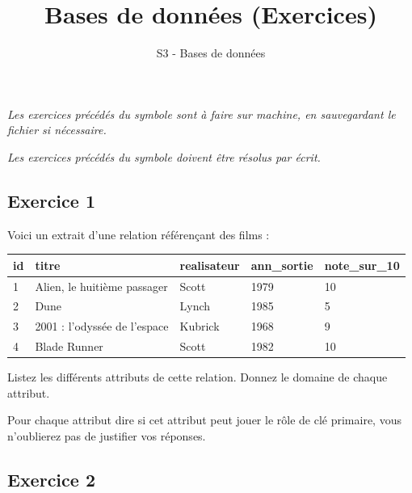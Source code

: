 \documentclass[
  a4paper,
  DIV=11,
  numbers=noendperiod]{scrartcl}
\title{Bases de données (Exercices)}
\subtitle{S3 - Bases de données}
\author{}
\date{}
\begin{document}
\maketitle
{}  \chead{} \cfoot{}   \renewcommand{\headrulewidth}{0pt} \renewcommand{\footrulewidth}{0pt} \thispagestyle{fancy} \vspace{-3cm}

\ifdefined\Shaded\renewenvironment{Shaded}{\begin{tcolorbox}[enhanced, interior hidden, borderline west={3pt}{0pt}{shadecolor}, sharp corners, frame hidden, breakable, boxrule=0pt]}{\end{tcolorbox}}\fi

\emph{Les exercices précédés du symbole  sont à faire
sur machine, en sauvegardant le fichier si nécessaire.}

\emph{Les exercices précédés du symbole  doivent être
résolus par écrit.}

\hypertarget{fa-solid-pencil-alt-exercice-1}{%
\subsection{\texorpdfstring{ Exercice
1}{ Exercice 1}}\label{fa-solid-pencil-alt-exercice-1}}

Voici un extrait d'une relation référençant des films :

\begin{longtable}[]{@{}lllll@{}}
\toprule()
id & titre & realisateur & ann\_sortie & note\_sur\_10 \\
\midrule()
\endhead
1 & Alien, le huitième passager & Scott & 1979 & 10 \\
2 & Dune & Lynch & 1985 & 5 \\
3 & 2001 : l'odyssée de l'espace & Kubrick & 1968 & 9 \\
4 & Blade Runner & Scott & 1982 & 10 \\
\bottomrule()
\end{longtable}

Listez les différents attributs de cette relation. Donnez le domaine de
chaque attribut.

Pour chaque attribut dire si cet attribut peut jouer le rôle de clé
primaire, vous n'oublierez pas de justifier vos réponses.

\hypertarget{fa-solid-pencil-alt-exercice-2}{%
\subsection{\texorpdfstring{ Exercice
2}{ Exercice 2}}\label{fa-solid-pencil-alt-exercice-2}}
\end{document}
